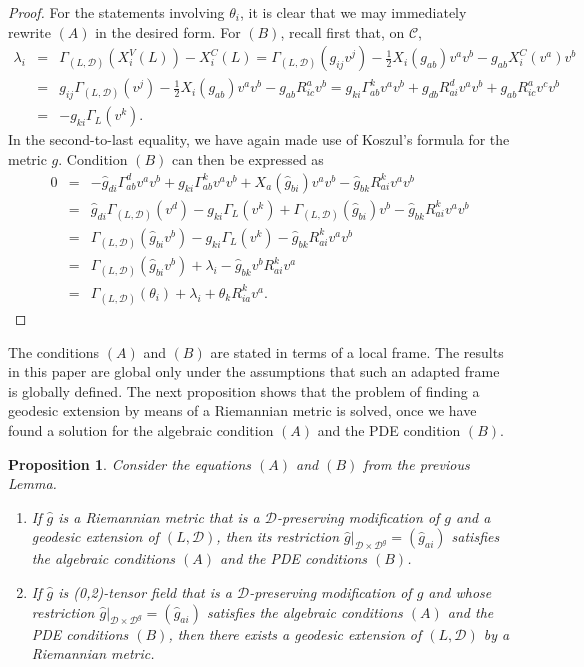 \documentclass[11pt]{article}
\newtheorem{prop}{Proposition}
\def\D{{\mathcal D}}
\def\C{{\mathcal C}}
\begin{document}
\begin{proof}
For the statements involving $\theta_i$, it is clear that we may immediately rewrite $(A)$ in the desired form. For $(B)$, recall first that, on $\C$,
\begin{eqnarray*}
    \lambda_i&=& \Gamma_{(L,\mathcal{D})}(X_i^V(L))-X_i^C(L) = \Gamma_{(L,\mathcal{D})}(g_{ij}v^j)-\frac{1}{2}X_i(g_{ab})v^a v^b -g_{ab}X_i^C(v^a)v^b \\
    &=& g_{ij} \Gamma_{(L,\mathcal{D})}(v^j) -\frac{1}{2}X_i(g_{ab})v^a v^b -g_{ab}R^a_{ic}v^b = g_{ki}\Gamma^k_{ab}v^a v^b+g_{db}R^d_{ai}v^a v^b+g_{ab}R^a_{ic}v^c v^b \\&=& -g_{ki}\Gamma_L(v^k). 
\end{eqnarray*}
In {the second-to-last  equality}, we have again made use of Koszul's formula for the metric $g$.
Condition $(B)$ can then be expressed as
\begin{eqnarray*}
    0
&=& -\hat{g}_{di}\Gamma^d_{ab}v^a v^b+g_{ki}\Gamma^k_{ab}v^a v^b+
X_a(\hat{g}_{bi})v^a v^b-\hat{g}_{bk} R^k_{ai}v^a v^b 
\\&=&\hat{g}_{di}\Gamma_{(L,\mathcal{D})}(v^d) -g_{ki}\Gamma_L(v^k)+\Gamma_{(L,\mathcal{D})}(\hat{g}_{bi})v^b-\hat{g}_{bk}R^k_{ai}v^a v^b\\
&=& \Gamma_{(L,\mathcal{D})}(\hat{g}_{bi} v^b)-g_{ki}\Gamma_L(v^k)-\hat{g}_{bk}R^k_{ai}v^a v^b\\
&=& \Gamma_{(L,\mathcal{D})}(\hat{g}_{bi}v^b)+\lambda_i-\hat{g}_{bk}v^b R^k_{ai}v^a\\
&=&  \Gamma_{(L,\mathcal{D})}(\theta_i)+\lambda_i+\theta_k R^k_{ia}v^a.
\end{eqnarray*}
\end{proof}

{The conditions $(A)$ and $(B)$ are stated in terms of a local frame. The results in this paper are global only under the assumptions that such an adapted frame is globally defined.} The next proposition shows that the problem of finding a geodesic extension by means of a Riemannian metric is solved, once we have found a solution for the algebraic condition $(A)$ and the {PDE condition $(B)$}.

\begin{prop}   \label{prop:result2}
 Consider the equations $(A)$ and $(B)$ from the previous Lemma.
\begin{enumerate} \item If $\hat g$ is a Riemannian metric that is a $\D$-preserving modification of $g$ and a geodesic extension of $(L,\D)$, then its restriction ${\hat g}|_{\D\times\D^g}=({\hat g}_{ai})$ satisfies the algebraic conditions $(A)$ and the PDE conditions $(B)$.

\item If $\hat g$ is (0,2)-tensor field that is a $\D$-preserving modification of $g$ and whose restriction ${\hat g}|_{\D\times\D^g}=({\hat g}_{ai})$  satisfies the algebraic conditions $(A)$ and the PDE conditions $(B)$, then there exists a geodesic extension of $(L,\D)$ by a  Riemannian metric.
\end{enumerate}
\end{prop}
\end{document}
